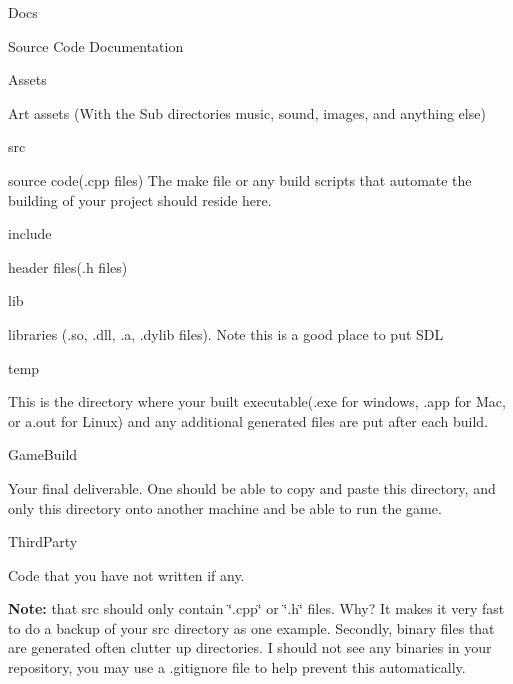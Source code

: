 \begin{DoxyItemize}
\item Docs
\begin{DoxyItemize}
\item Source Code Documentation
\end{DoxyItemize}
\item Assets
\begin{DoxyItemize}
\item Art assets (With the Sub directories music, sound, images, and anything else)
\end{DoxyItemize}
\item src
\begin{DoxyItemize}
\item source code(.cpp files) The make file or any build scripts that automate the building of your project should reside here.
\end{DoxyItemize}
\item include
\begin{DoxyItemize}
\item header files(.h files)
\end{DoxyItemize}
\item lib
\begin{DoxyItemize}
\item libraries (.so, .dll, .a, .dylib files). Note this is a good place to put S\+DL
\end{DoxyItemize}
\item temp
\begin{DoxyItemize}
\item This is the directory where your built executable(.exe for windows, .app for Mac, or a.\+out for Linux) and any additional generated files are put after each build.
\end{DoxyItemize}
\item Game\+Build
\begin{DoxyItemize}
\item Your final deliverable. One should be able to copy and paste this directory, and only this directory onto another machine and be able to run the game.
\end{DoxyItemize}
\item Third\+Party
\begin{DoxyItemize}
\item Code that you have not written if any.
\end{DoxyItemize}
\end{DoxyItemize}

{\bfseries{Note\+:}} that src should only contain \char`\"{}.\+cpp\char`\"{} or \char`\"{}.\+h\char`\"{} files. Why? It makes it very fast to do a backup of your src directory as one example. Secondly, binary files that are generated often clutter up directories. I should not see any binaries in your repository, you may use a \textquotesingle{}.gitignore\textquotesingle{} file to help prevent this automatically. 